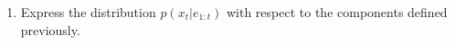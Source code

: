 \documentclass[11pt, a4paper]{article}
\begin{document}
\begin{enumerate}
    \item Express the distribution $p(x_t | e_{1:t})$ with respect to the components defined previously.



\end{enumerate}
\end{document}
